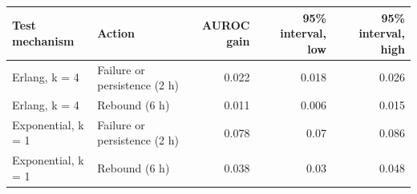 \begin{tabular}{llrrr}
\toprule
Test mechanism & Action & AUROC gain & 95\% interval, low & 95\% interval, high \\
\midrule
Erlang, k = 4 & Failure or persistence (2 h) & 0.022 & 0.018 & 0.026 \\
Erlang, k = 4 & Rebound (6 h) & 0.011 & 0.006 & 0.015 \\
Exponential, k = 1 & Failure or persistence (2 h) & 0.078 & 0.07 & 0.086 \\
Exponential, k = 1 & Rebound (6 h) & 0.038 & 0.03 & 0.048 \\
\bottomrule
\end{tabular}
